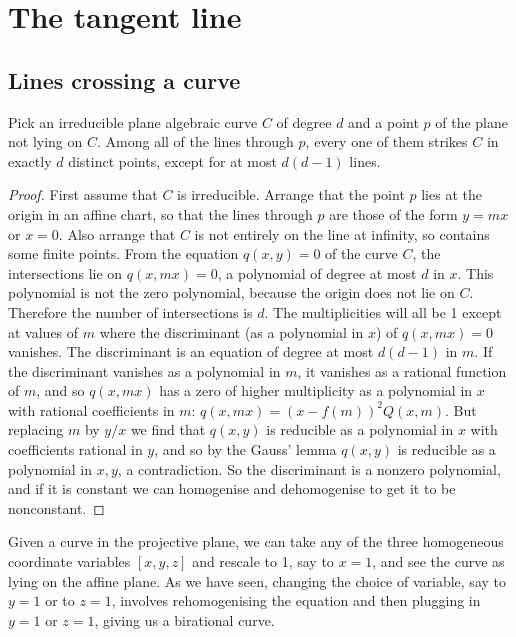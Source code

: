 \chapter{The tangent line}\label{chapter:tangent.line}

\section{Lines crossing a curve}

\begin{proposition}
Pick an irreducible plane algebraic curve \(C\) of degree \(d\) and a point \(p\) of the plane not lying on \(C\).
Among all of the lines through \(p\), every one of them strikes \(C\) in exactly \(d\) distinct points, except for at most \(d(d-1)\) lines.
\end{proposition}
\begin{proof}
First assume that \(C\) is irreducible.
Arrange that the point \(p\) lies at the origin in an affine chart, so that the lines through \(p\) are those of the form \(y=mx\) or \(x=0\).
Also arrange that \(C\) is not entirely on the line at infinity, so contains some finite points.
From the equation \(q(x,y)=0\) of the curve \(C\), the intersections lie on \(q(x,mx)=0\), a polynomial of degree at most \(d\) in \(x\).
This polynomial is not the zero polynomial, because the origin does not lie on \(C\).
Therefore the number of intersections is \(d\).
The multiplicities will all be 1 except at values of \(m\) where the discriminant (as a polynomial in \(x\)) of \(q(x,mx)=0\) vanishes.
The discriminant is an equation of degree at most \(d(d-1)\) in \(m\).
If the discriminant vanishes as a polynomial in \(m\), it vanishes as a rational function of \(m\), and so \(q(x,mx)\) has a zero of higher multiplicity as a polynomial in \(x\) with rational coefficients in \(m\): \(q(x,mx)=(x-f(m))^2 Q(x,m)\).
But replacing \(m\) by \(y/x\) we find that \(q(x,y)\) is reducible as a polynomial in \(x\) with coefficients rational in \(y\), and so by the Gauss' lemma \(q(x,y)\) is reducible as a polynomial in \(x,y\), a contradiction.
So the discriminant is a nonzero polynomial, and if it is constant we can homogenise and dehomogenise to get it to be nonconstant.
\end{proof}


Given a curve in the projective plane, we can take any of the three homogeneous coordinate variables \([x,y,z]\) and rescale to 1, say to \(x=1\), and see the curve as lying on the affine plane.
As we have seen, changing the choice of variable, say to \(y=1\) or to \(z=1\), involves rehomogenising the equation and then plugging in \(y=1\) or \(z=1\), giving us a birational curve.


